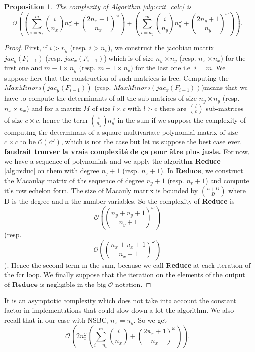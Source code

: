 \documentclass[english]{article}
\newtheorem{proposition}{Proposition}[section]
\begin{document}
		\begin{proposition}\label{complexCrit}
			The complexity of Algorithm \ref{alg:crit_calc} is
			$$
			\mathcal{O}\left(\left(\sum_{i = n_x}^{m} \binom{i}{n_x}n_x^{\omega} + \binom{2n_x + 1}{n_x}^\omega\right) + \left(\sum_{i = n_y}^{m} \binom{i}{n_y}n_y^{\omega} + \binom{2n_y + 1}{n_y}^\omega\right)\right).
			$$
		\end{proposition}
		
		\begin{proof}
			First, if $i > n_y$ (resp. $i > n_x$), we construct the jacobian matrix $jac_y(F_{i-1})$ (resp. $jac_x(F_{i-1})$) which is of size $n_y \times n_y$ (resp. $n_x \times n_x$) for the first one and $m-1 \times n_y$ (resp. $m-1 \times n_x$) for the last one i.e. $i = m$. We suppose here that the construction of such matrices is free. Computing the $MaxMinors(jac_y(F_{i-1}))$ (resp. $MaxMinors(jac_x(F_{i-1}))$)means that we have to compute the determinants of all the sub-matrices of size $n_y \times n_y$ (resp. $n_x \times n_x$) and for a matrix $M$ of size $l \times c$ with $l > c$ there are $\binom{l}{c}$ sub-matrices of size $c \times c$, hence the term $\binom{i}{n_y}n_y^{\omega}$ in the sum if we suppose the complexity of computing the determinant of a square multivariate polynomial matrix of size $c \times c$ to be $\mathcal{O}(c^\omega)$, which is not the case but let us suppose the best case ever. \textbf{faudrait trouver la vraie complexité de ça pour être plus juste.}
			For now, we have a sequence of polynomials and we apply the algorithm \textbf{Reduce} \ref{alg:reduc} on them with degree $n_y + 1$ (resp. $n_x + 1$).
			In \textbf{Reduce}, we construct the Macaulay matrix of the sequence of degree $n_y + 1$ (resp. $n_x + 1$) and compute it's row echelon form.
			The size of Macauly matrix is bounded by $\binom{n + D}{D}$ where D is the degree and n the number variables. So the complexity of \textbf{Reduce} is $$\mathcal{O}\left(\binom{n_y + n_y + 1}{n_y + 1}^\omega \right)$$ (resp. $$\mathcal{O}\left(\binom{n_x + n_x + 1}{n_x + 1}^\omega \right)$$). Hence the second term in the sum, because we call \textbf{Reduce} at each iteration of the for loop. We finally suppose that the iteration on the elements of the output of \textbf{Reduce} is negligible in the big $\mathcal{O}$ notation.
		\end{proof}
		
		It is an asymptotic complexity which does not take into account the constant factor in implementations that could slow down a lot the algorithm.
		We also recall that in our case with NSBC, $n_x = n_y$. So we get
		$$
		\mathcal{O}\left(2n_x^{\omega}\left(\sum_{i = n_x}^{m} \binom{i}{n_x} + \binom{2n_x + 1}{n_x}^\omega\right)\right).
		$$
		
\end{document}

